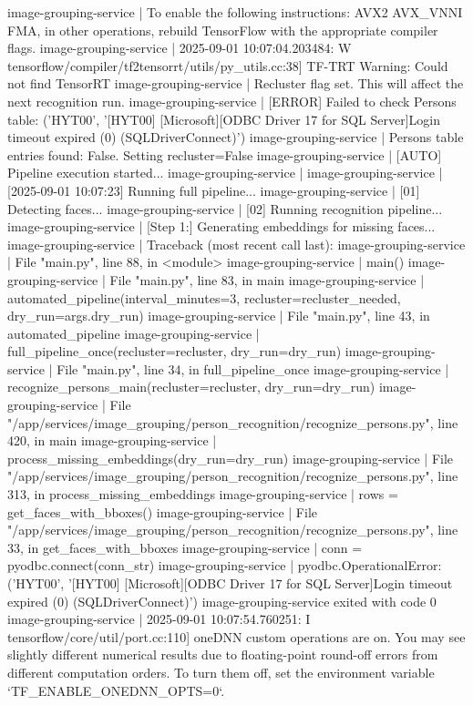 image-grouping-service  | To enable the following instructions: AVX2 AVX_VNNI FMA, in other operations, rebuild TensorFlow with the appropriate compiler flags.
image-grouping-service  | 2025-09-01 10:07:04.203484: W tensorflow/compiler/tf2tensorrt/utils/py_utils.cc:38] TF-TRT Warning: Could not find TensorRT
image-grouping-service  | Recluster flag set. This will affect the next recognition run.
image-grouping-service  | [ERROR] Failed to check Persons table: ('HYT00', '[HYT00] [Microsoft][ODBC Driver 17 for SQL Server]Login timeout expired (0) (SQLDriverConnect)')
image-grouping-service  | Persons table entries found: False. Setting recluster=False
image-grouping-service  | [AUTO] Pipeline execution started...
image-grouping-service  |
image-grouping-service  | [2025-09-01 10:07:23] Running full pipeline...
image-grouping-service  | [01] Detecting faces...
image-grouping-service  | [02] Running recognition pipeline...
image-grouping-service  | [Step 1:] Generating embeddings for missing faces...
image-grouping-service  | Traceback (most recent call last):
image-grouping-service  |   File "main.py", line 88, in <module>
image-grouping-service  |     main()
image-grouping-service  |   File "main.py", line 83, in main
image-grouping-service  |     automated_pipeline(interval_minutes=3, recluster=recluster_needed, dry_run=args.dry_run)
image-grouping-service  |   File "main.py", line 43, in automated_pipeline
image-grouping-service  |     full_pipeline_once(recluster=recluster, dry_run=dry_run)
image-grouping-service  |   File "main.py", line 34, in full_pipeline_once
image-grouping-service  |     recognize_persons_main(recluster=recluster, dry_run=dry_run)
image-grouping-service  |   File "/app/services/image_grouping/person_recognition/recognize_persons.py", line 420, in main
image-grouping-service  |     process_missing_embeddings(dry_run=dry_run)
image-grouping-service  |   File "/app/services/image_grouping/person_recognition/recognize_persons.py", line 313, in process_missing_embeddings
image-grouping-service  |     rows = get_faces_with_bboxes()
image-grouping-service  |   File "/app/services/image_grouping/person_recognition/recognize_persons.py", line 33, in get_faces_with_bboxes
image-grouping-service  |     conn = pyodbc.connect(conn_str)
image-grouping-service  | pyodbc.OperationalError: ('HYT00', '[HYT00] [Microsoft][ODBC Driver 17 for SQL Server]Login timeout expired (0) (SQLDriverConnect)')
image-grouping-service exited with code 0
image-grouping-service  | 2025-09-01 10:07:54.760251: I tensorflow/core/util/port.cc:110] oneDNN custom operations are on. You may see slightly different numerical results due to floating-point round-off errors from different computation orders. To turn them off, set the environment variable `TF_ENABLE_ONEDNN_OPTS=0`.
